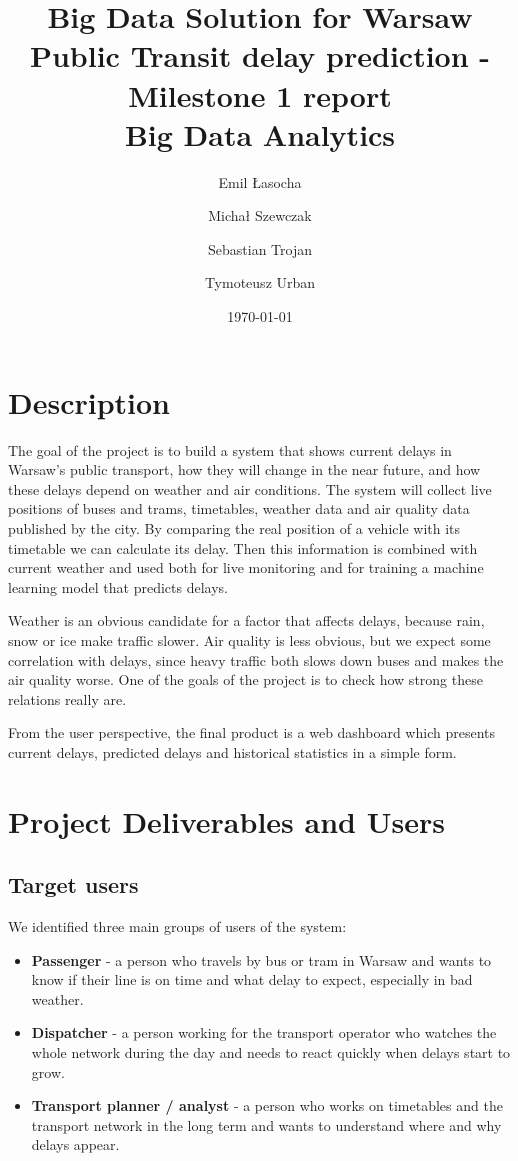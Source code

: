 \documentclass[11pt]{article}
\title{
    \textbf{Big Data Solution for Warsaw Public Transit delay prediction - Milestone 1 report} \\[0.5cm]
    \large Big Data Analytics
}
\author{Emil Łasocha \and Michał Szewczak \and Sebastian Trojan \and Tymoteusz Urban}
\date{\today}
\begin{document}
\maketitle
\section{Description}

The goal of the project is to build a system that shows current delays in Warsaw's public transport, how they will change in the near future, and how these delays depend on weather and air conditions. The system will collect live positions of buses and trams, timetables, weather data and air quality data published by the city. By comparing the real position of a vehicle with its timetable we can calculate its delay. Then this information is combined with current weather and used both for live monitoring and for training a machine learning model that predicts delays.

Weather is an obvious candidate for a factor that affects delays, because rain, snow or ice make traffic slower. Air quality is less obvious, but we expect some correlation with delays, since heavy traffic both slows down buses and makes the air quality worse. One of the goals of the project is to check how strong these relations really are.

From the user perspective, the final product is a web dashboard which presents current delays, predicted delays and historical statistics in a simple form.

\section{Project Deliverables and Users}

\subsection{Target users}

We identified three main groups of users of the system:
\begin{itemize}
    \item \textbf{Passenger} - a person who travels by bus or tram in Warsaw and wants to know if their line is on time and what delay to expect, especially in bad weather.
    \item \textbf{Dispatcher} - a person working for the transport operator who watches the whole network during the day and needs to react quickly when delays start to grow.
    \item \textbf{Transport planner / analyst} - a person who works on timetables and the transport network in the long term and wants to understand where and why delays appear.
\end{itemize}
\end{document}
